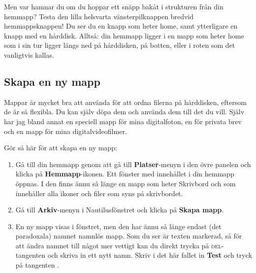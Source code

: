 \documentclass[a4paper,final]{memoir} %
\begin{document}
Men var hamnar du om du hoppar ett snäpp bakåt i strukturen från din hemmapp? Testa den lilla helsvarta vänsterpilknappen bredvid hemmappsknappen! Du ser du en knapp som heter home, samt ytterligare en knapp med en hårddisk. Alltså: din hemmapp ligger i en mapp som heter home som i sin tur ligger längs ned på hårddisken, på botten, eller i roten som det vanligtvis kallas. 



\subsection{Skapa en ny mapp}


Mappar är mycket bra att använda för att ordna filerna på hårddisken, eftersom de är så flexibla. Du kan själv döpa dem och använda dem till det du vill. Själv har jag bland annat en speciell mapp för mina digitalfoton, en för privata brev och en mapp för mina digitalvideofilmer. 

Gör så här för att skapa en ny mapp:

\begin{enumerate}

\item Gå till din hemmapp genom att gå till \textbf{Platser}-menyn i den övre panelen och klicka på \textbf{Hemmapp}-ikonen. Ett fönster med innehållet i din hemmapp öppnas. I den finns ännu så länge en mapp som heter Skrivbord och som innehåller alla ikoner och filer som syns på skrivbordet. 
\item Gå till \textbf{Arkiv}-menyn i Nautilusfönstret och klicka på \textbf{Skapa mapp}.
\item En ny mapp visas i fönstret, men den har ännu så länge endast (det paradoxala) namnet namnlös mapp. Som du ser är texten markerad, så för att ändra namnet till något mer vettigt kan du direkt trycka på \textsc{del}-tangenten och skriva in ett nytt namn. Skriv i det här fallet in \textbf{Test} och tryck på tangenten \xenter{}.

\end{enumerate}
\end{document}
